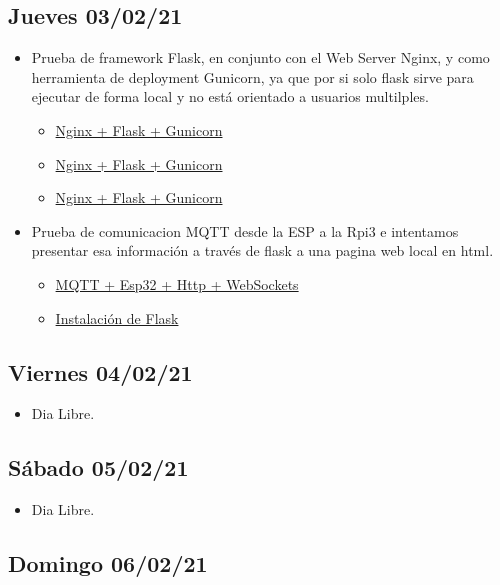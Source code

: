 \subsection*{Jueves 03/02/21}
    \begin{itemize}
        \item Prueba de framework Flask, en conjunto con el Web Server Nginx, y como herramienta de deployment Gunicorn, ya que por si solo flask sirve para ejecutar de forma local y no está orientado a usuarios multilples.
        \begin{itemize}
            \item \href{https://linuxhint.com/use-nginx-with-flask/}{Nginx + Flask + Gunicorn}
            \item \href{https://j2logo.com/tutorial-flask-leccion-17-desplegar-flask-produccion-nginx-gunicorn/}{Nginx + Flask + Gunicorn}
            \item \href{https://faun.pub/deploy-flask-app-with-nginx-using-gunicorn-7fda4f50066a}{Nginx + Flask + Gunicorn}
        \end{itemize}
        
        \item Prueba de comunicacion MQTT desde la ESP a la Rpi3 e intentamos presentar esa información a través de flask a una pagina web local en html.
        \begin{itemize}
            \item \href{https://www.rosietheredrobot.com/2018/11/red-current-and-serial.html}{MQTT + Esp32 + Http + WebSockets}
            \item \href{https://www.rosietheredrobot.com/2017/09/a-web-of-pies.html}{Instalación de Flask}
        \end{itemize}
    \end{itemize}
\subsection*{Viernes 04/02/21}
    \begin{itemize}
        \item Dia Libre.
    \end{itemize}

\subsection*{Sábado 05/02/21}
    \begin{itemize}
        \item Dia Libre.
    \end{itemize}

\subsection*{Domingo 06/02/21}




\clearpage